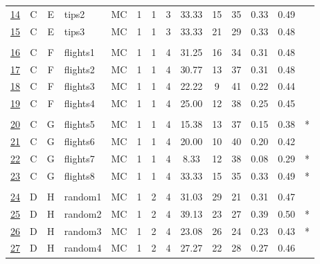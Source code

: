 \documentclass[12pt,english,nohyper]{tufte-handout}\usepackage[]{graphicx}\usepackage[]{color}
\begin{document}
\begin{longtable}{cccl|cccc|ccccc|l}
  \hyperlink{T03.C.E.03.1.1.MC.tips2.2}{14} & C & E & tips2 & MC &   1 &   1 &   3 & 33.33 &  15 &  35 & 0.33 & 0.49 &  \\ 
  \hyperlink{T03.C.E.03.1.1.MC.tips3.2}{15} & C & E & tips3 & MC &   1 &   1 &   3 & 33.33 &  21 &  29 & 0.33 & 0.48 &  \\ 
   &  &  &  &  &  &  &  &  &  &  &  &  &  \\ 
  \hyperlink{T03.C.F.04.1.1.MC.flights1.2}{16} & C & F & flights1 & MC &   1 &   1 &   4 & 31.25 &  16 &  34 & 0.31 & 0.48 &  \\ 
  \hyperlink{T03.C.F.04.1.1.MC.flights2.2}{17} & C & F & flights2 & MC &   1 &   1 &   4 & 30.77 &  13 &  37 & 0.31 & 0.48 &  \\ 
  \hyperlink{T03.C.F.04.1.1.MC.flights3.2}{18} & C & F & flights3 & MC &   1 &   1 &   4 & 22.22 &   9 &  41 & 0.22 & 0.44 &  \\ 
  \hyperlink{T03.C.F.04.1.1.MC.flights4.2}{19} & C & F & flights4 & MC &   1 &   1 &   4 & 25.00 &  12 &  38 & 0.25 & 0.45 &  \\ 
   &  &  &  &  &  &  &  &  &  &  &  &  &  \\ 
  \hyperlink{T03.C.G.04.1.1.MC.flights5.2}{20} & C & G & flights5 & MC &   1 &   1 &   4 & 15.38 &  13 &  37 & 0.15 & 0.38 & * \\ 
  \hyperlink{T03.C.G.04.1.1.MC.flights6.2}{21} & C & G & flights6 & MC &   1 &   1 &   4 & 20.00 &  10 &  40 & 0.20 & 0.42 &  \\ 
  \hyperlink{T03.C.G.04.1.1.MC.flights7.2}{22} & C & G & flights7 & MC &   1 &   1 &   4 & 8.33 &  12 &  38 & 0.08 & 0.29 & * \\ 
  \hyperlink{T03.C.G.04.1.1.MC.flights8.2}{23} & C & G & flights8 & MC &   1 &   1 &   4 & 33.33 &  15 &  35 & 0.33 & 0.49 & * \\ 
   &  &  &  &  &  &  &  &  &  &  &  &  &  \\ 
  \hyperlink{T03.D.H.04.2.1.MC.random1.2}{24} & D & H & random1 & MC &   1 &   2 &   4 & 31.03 &  29 &  21 & 0.31 & 0.47 &  \\ 
  \hyperlink{T03.D.H.04.2.1.MC.random2.2}{25} & D & H & random2 & MC &   1 &   2 &   4 & 39.13 &  23 &  27 & 0.39 & 0.50 & * \\ 
  \hyperlink{T03.D.H.04.2.1.MC.random3.2}{26} & D & H & random3 & MC &   1 &   2 &   4 & 23.08 &  26 &  24 & 0.23 & 0.43 & * \\ 
  \hyperlink{T03.D.H.04.2.1.MC.random4.2}{27} & D & H & random4 & MC &   1 &   2 &   4 & 27.27 &  22 &  28 & 0.27 & 0.46 &  \\ 

\end{longtable}
\end{document}
